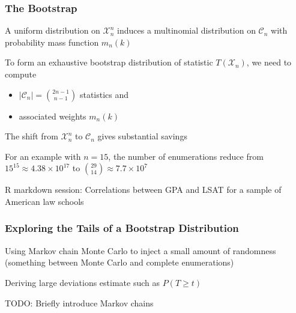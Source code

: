 \documentclass[10pt]{beamer}
\begin{document}
\begin{frame}
\frametitle{The Bootstrap}

A uniform distribution on $\mathcal{X}_n^n$ induces a multinomial distribution on $\mathcal{C}_n$ with probability mass function $m_n(k)$ \newline

To form an exhaustive bootstrap distribution of statistic $T(\mathcal{X}_n)$, \newline
we need to compute  
\begin{itemize}
\item $|\mathcal{C}_n| = \binom{2n-1 }{n-1}$ statistics and 
\item associated weights $m_n(k)$
\end{itemize}

\vspace{0.3cm}
The shift from $\mathcal{X}_n^n$ to $\mathcal{C}_n$ gives substantial savings \newline

For an example with $n = 15$, the number of enumerations reduce from $15^{15} \approx 4.38 \times 10^{17}$ to $\binom{29}{14} \approx 7.7 \times 10^7$ \newline

\alert{R markdown session:} Correlations between GPA and LSAT for a sample of American law schools

\end{frame}

\begin{frame}
\frametitle{Exploring the Tails of a Bootstrap Distribution}

Using Markov chain Monte Carlo to inject a small amount of randomness (something between Monte Carlo and complete enumerations) \newline

Deriving large deviations estimate such as $P( T \ge t)$ \newline

TODO: Briefly introduce Markov chains \newline

\end{frame}
\end{document}
